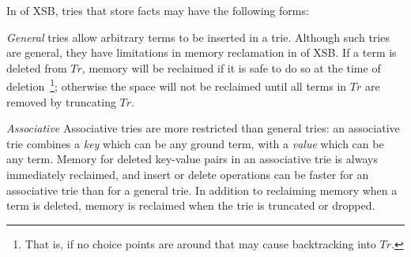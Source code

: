 In \version{} of XSB, tries that store facts may have the following
forms:
%
\bi
\item {\em General} tries allow arbitrary terms to be inserted in a
  trie.
  Although such tries are general, they have limitations in memory
  reclamation in \version{} of XSB.  If a term is deleted from $Tr$,
  memory will be reclaimed if it is safe to do so at the time of
  deletion~\footnote{That is, if no choice points are around that may
    cause backtracking into $Tr$.}; otherwise the space will not be
  reclaimed until all terms in $Tr$ are removed by truncating $Tr$.

\item {\em Associative} Associative tries are more restricted
  than general tries: an associative trie combines a {\em key} which
  can be any ground term, with a {\em value} which can be any term.
  Memory for deleted key-value pairs in an associative trie is always
  immediately reclaimed, and insert or delete operations can be faster
  for an associative trie than for a general trie.
  In addition to reclaiming memory when a term is deleted, memory is
  reclaimed when the trie is truncated or dropped.

%
%
  \ei

